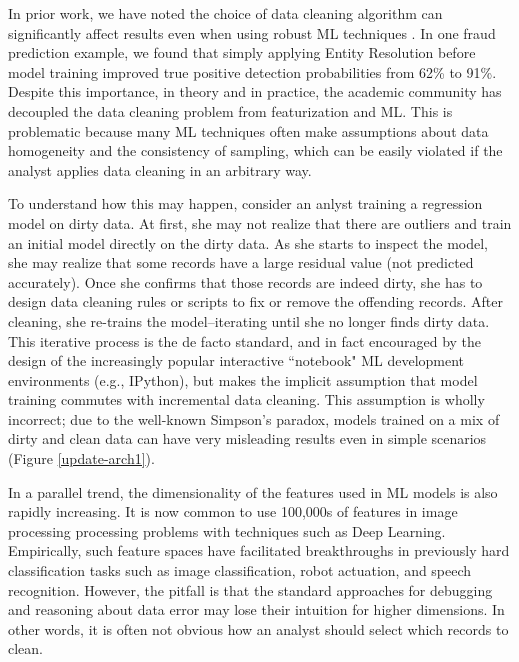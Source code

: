 In prior work, we have noted the choice of data cleaning algorithm can significantly affect results even when using robust ML techniques \cite{activecleanarxiv, DBLP:conf/case/MahlerKLSMKPWFAG14}.
In one fraud prediction example, we found that simply applying Entity Resolution before model training improved true positive detection probabilities from 62\% to 91\%. 
Despite this importance, in theory and in practice, the academic community has decoupled the data cleaning problem from featurization and ML.
This is problematic because many ML techniques often make assumptions about data homogeneity and the consistency of sampling, which can be easily violated if the analyst applies data cleaning in an arbitrary way.

To understand how this may happen, consider an anlyst training a regression model on dirty data. At first, she may not realize that there are outliers and train an initial model directly on the dirty data. 
As she starts to inspect the model, she may realize that some records have a large residual value (not predicted accurately). 
Once she confirms that those records are indeed dirty, she has to design data cleaning rules or scripts to fix or remove the offending records. 
After cleaning, she re-trains the model--iterating until she no longer finds dirty data.
This iterative process is the de facto standard, and in fact encouraged by the design of the increasingly popular interactive ``notebook" ML development environments (e.g., IPython), but makes the implicit assumption that model training commutes with incremental data cleaning.
This assumption is wholly incorrect; due to the well-known Simpson's paradox, models trained on a mix of dirty and clean data can have very misleading results even in simple scenarios (Figure \ref{update-arch1}).

In a parallel trend, the dimensionality of the features used in ML models is also rapidly increasing. 
It is now common to use 100,000s of features in image processing processing problems with techniques such as Deep Learning.
Empirically, such feature spaces have facilitated breakthroughs in previously hard classification tasks such as image classification, robot actuation, and speech recognition.
However, the pitfall is that the standard approaches for debugging and reasoning about data error may lose their intuition for higher dimensions.
In other words, it is often not obvious how an analyst should select which records to clean.

